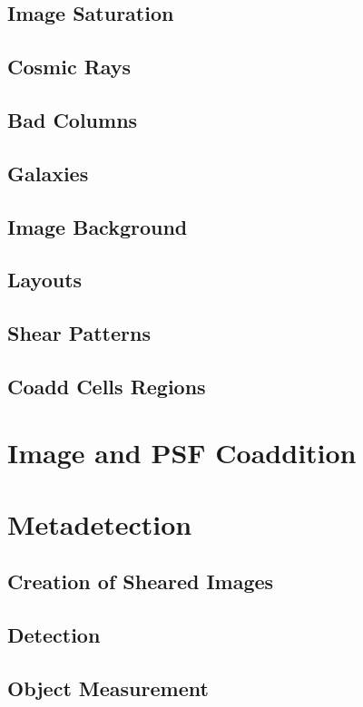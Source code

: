 \documentclass[iop, twocolappendix, appendixfloats, numberedappendix, apj]{hackemulateapj}
\begin{document}
\subsection{Image Saturation}
\subsection{Cosmic Rays}
\subsection{Bad Columns}
\subsection{Galaxies}
\subsection{Image Background}

\subsection{Layouts}

\subsection{Shear Patterns}

\subsection{Coadd Cells Regions}

\section{Image and PSF Coaddition}
\section{Metadetection}
\subsection{Creation of Sheared Images}
\subsection{Detection}
\subsection{Object Measurement}
\end{document}
